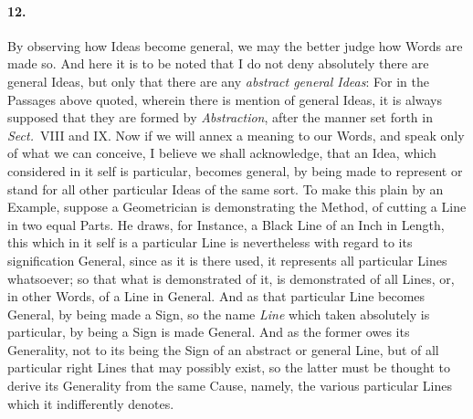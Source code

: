 \documentclass[]{article}
\newenvironment{sectionbody}{\begin{multicols}{2}}{\end{multicols}}
\begin{document}
\begin{sectionbody}
\paragraph{12.} By observing how Ideas become general, we may the better judge
how Words are made so.  And here it is to be noted that I do not
deny absolutely there are general Ideas, but only that there are
any \emph{abstract general Ideas}: For in the Passages above
quoted, wherein there is mention of general Ideas, it is always
supposed that they are formed by \emph{Abstraction}, after the
manner set forth in
\emph{Sect.}~VIII and IX.
Now if we will annex a meaning to our Words, and speak only of
what we can conceive, I believe we shall acknowledge, that an
Idea, which considered in it self is particular, becomes general,
by being made to represent or stand for all other particular
Ideas of the same sort.  To make this plain by an Example,
suppose a Geometrician is demonstrating the Method, of cutting a
Line in two equal Parts.  He draws, for Instance, a Black Line of
an Inch in Length, this which in it self is a particular Line is
nevertheless with regard to its signification General, since as
it is there used, it represents all particular Lines whatsoever;
so that what is demonstrated of it, is demonstrated of all Lines,
or, in other Words, of a Line in General.  And as that particular
Line becomes General, by being made a Sign, so the name
\emph{Line} which taken absolutely is particular, by being a
Sign is made General.  And as the former owes its Generality, not
to its being the Sign of an abstract or general Line, but of all
particular right Lines that may possibly exist, so the latter
must be thought to derive its Generality from the same Cause,
namely, the various particular Lines which it indifferently
denotes.




\end{sectionbody}
\end{document}
